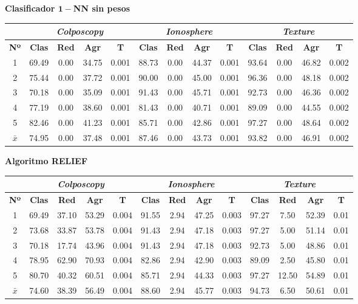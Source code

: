 \documentclass[12pt]{article}
\begin{document}
{\color{red}\textbf{Clasificador $\boldsymbol{1-}$NN sin pesos}}

\begin{table}[ht!]
\begin{tabular}{ccccc|cccc|cccc}
\centering
 & \multicolumn{4}{c}{\textit{Colposcopy}} & \multicolumn{4}{c}{\textit{Ionosphere}} & \multicolumn{4}{c}{\textit{Texture}} \\ \hline
\textbf{Nº} & \textbf{Clas} & \textbf{Red} & \textbf{Agr} & \textbf{T} & \textbf{Clas} & \textbf{Red} & \textbf{Agr} & \textbf{T} & \textbf{Clas} & \textbf{Red} & \textbf{Agr} & \textbf{T} \\ \hline
1 & 69.49 & 0.00 & 34.75 & 0.001 & 88.73 & 0.00 & 44.37 & 0.001 & 93.64 & 0.00 & 46.82 & 0.002\\
2 & 75.44 & 0.00 & 37.72 & 0.001 & 90.00 & 0.00 & 45.00 & 0.001 & 96.36 & 0.00 & 48.18 & 0.002\\
3 & 70.18 & 0.00 & 35.09 & 0.001 & 91.43 & 0.00 & 45.71 & 0.001 & 92.73 & 0.00 & 46.36 & 0.002\\
4 & 77.19 & 0.00 & 38.60 & 0.001 & 81.43 & 0.00 & 40.71 & 0.001 & 89.09 & 0.00 & 44.55 & 0.002\\
5 & 82.46 & 0.00 & 41.23 & 0.001 & 85.71 & 0.00 & 42.86 & 0.001 & 97.27 & 0.00 & 48.64 & 0.002\\
\hline
$\bar{x}$  & 74.95 & 0.00 & 37.48 & 0.001 & 87.46 & 0.00 & 43.73 & 0.001 & 93.82 & 0.00 & 46.91 & 0.002
\end{tabular}
\end{table}


\newpage

{\color{red}\textbf{Algoritmo RELIEF}}

\begin{table}[ht!]
\begin{tabular}{ccccc|cccc|cccc}
\centering
 & \multicolumn{4}{c}{\textit{Colposcopy}} & \multicolumn{4}{c}{\textit{Ionosphere}} & \multicolumn{4}{c}{\textit{Texture}} \\ \hline
\textbf{Nº} & \textbf{Clas} & \textbf{Red} & \textbf{Agr} & \textbf{T} & \textbf{Clas} & \textbf{Red} & \textbf{Agr} & \textbf{T} & \textbf{Clas} & \textbf{Red} & \textbf{Agr} & \textbf{T} \\ \hline
1 & 69.49 & 37.10 & 53.29 & 0.004 & 91.55 & 2.94 & 47.25 & 0.003 & 97.27 & 7.50 & 52.39 & 0.01\\
2 & 73.68 & 33.87 & 53.78 & 0.004 & 91.43 & 2.94 & 47.18 & 0.003 & 97.27 & 5.00 & 51.14 & 0.01\\
3 & 70.18 & 17.74 & 43.96 & 0.004 & 91.43 & 2.94 & 47.18 & 0.003 & 92.73 & 5.00 & 48.86 & 0.01\\
4 & 78.95 & 62.90 & 70.93 & 0.004 & 82.86 & 2.94 & 42.90 & 0.003 & 89.09 & 2.50 & 45.80 & 0.01\\
5 & 80.70 & 40.32 & 60.51 & 0.004 & 85.71 & 2.94 & 44.33 & 0.003 & 97.27 & 12.50 & 54.89 & 0.01\\
\hline
$\bar{x}$ & 74.60 & 38.39 & 56.49 & 0.004 & 88.60 & 2.94 & 45.77 & 0.003 & 94.73 & 6.50 & 50.61 & 0.01
\end{tabular}
\end{table}
\end{document}
